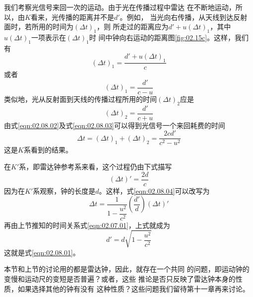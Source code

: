 我们考察光信号来回一次的运动。由于光在传播过程中雷达
在不断地运动，所以，由$K$看来，光传播的距离并不是$d'$。例如，
当光向右传播，从天线到达反射面时，若所用的时间为$\left(\Delta t\right)_1$，则
所走过的距离应为$ d ' + u \left( \Delta t \right) _ { 1 }$，其中$ u \left( \Delta t\right) _ { 1 } $一项表示在$\left(\Delta t\right)_1$时
间中钟向右运动的距离\lbr 图\ref{fig:02.15c}\rbr 。这样，我们有
\begin{equation*}
  \left( \Delta t \right) _ { 1 } = \frac { d ' + u \left(\Delta t\right)_1 } { c }
\end{equation*}
或者
\begin{equation}\label{eqn:02.08.02}
  \left( \Delta t \right) _ { 1 } = \frac { d ' } { c - u }
\end{equation}
类似地，光从反射面到天线的传播过程所用的时间$ \left(\Delta t\right)_2 $应是
\begin{equation}\label{eqn:02.08.03}
  \left( \Delta t \right) _ { 2 } = \frac { d ' } { c + u }
\end{equation}
由式\eqref{eqn:02.08.02}及式\eqref{eqn:02.08.03}可以得到光信号一个来回耗费的时间
\begin{equation}\label{eqn:02.08.04}
  \Delta t = \left( \Delta t \right) _ { 1 } + \left( \Delta t \right) _ { 2 } = \frac { 2 c d ' } { c ^ { 2 } - u ^ { 2 } }
\end{equation}
这是$K$系看到的结果。

在$K'$系，即雷达钟参考系来看，这个过程仍由下式描写
\begin{equation*}
  \left( \Delta t \right) ' = \frac { 2 d } { c }
\end{equation*}
因为在$K'$系观察，钟的长度是$d$。这样，式\eqref{eqn:02.08.04}可以改写为
\begin{equation*}
  \Delta t = \frac { 1 } { 1 - \dfrac { u ^ { 2 } } { c ^ { 2 } } } \left ( \frac { d ' } { d } \right) \left( \Delta t \right) '
\end{equation*}
再由上节推知的时间关系式\eqref{eqn:02.07.01}，上式就成为
\begin{equation*}
  d ' = d \sqrt { 1 - \frac { u ^ { 2 } } { c ^ { 2 } } }
\end{equation*}
\clearpage
\noindent 这就是式\eqref{eqn:02.08.01}。

本节和上节的讨论用的都是雷达钟，因此，就存在一个共同
的问题，即运动钟的变慢和运动尺的变短是否普遍？或者，这些
推论是否只反映了雷达钟本身的性质，如果选择其他的钟有没有
这种性质？这些问题我们留待第十一章再来讨论。
